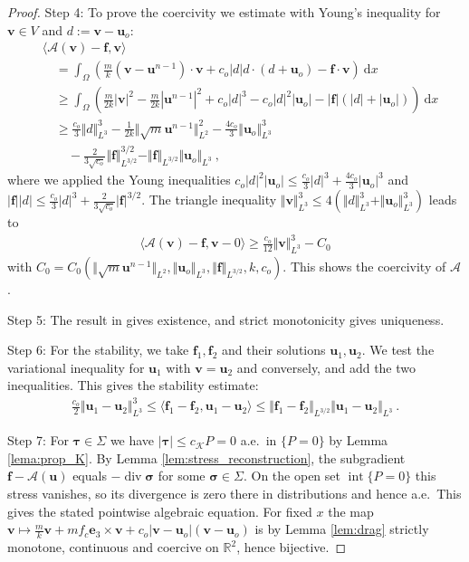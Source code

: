 \documentclass{article}
\theoremstyle{definition}
\newcommand{\bfu}{\boldsymbol{u}}
\newcommand{\bfv}{\boldsymbol{v}}
\newcommand{\bfsigma}{\boldsymbol{\sigma}}
\newcommand{\bftau}{\boldsymbol{\tau}}
\newcommand{\bfe}{\boldsymbol{e}}
\newcommand{\bff}{\boldsymbol{f}}
\newcommand{\K}{\mathcal{K}}
\newcommand{\dd}{\:\mathrm{d}}
\renewcommand\div{\operatorname{\mathrm{div}}}
\begin{document}
\begin{proof}
    Step 4: To prove the coercivity we estimate with Young's inequality for $\bfv\in V$ and
    $d := \bfv -\bfu_o$:
    \begin{align*}
        &\langle \mathcal{A} (\bfv) - \bff , \bfv \rangle\\
        &\quad= \int_\Omega \left(\frac m k (\bfv-\bfu^{n-1})\cdot \bfv + c_o |d| d\cdot(d+\bfu_o)-\bff \cdot \bfv\right) \dd x\\
        &\quad\geq \int_\Omega \left(\frac{m}{2k} |\bfv|^{2} - \frac{m}{2k}|\bfu^{n-1}|^{2} + c_o |d|^3 - c_o |d|^2|\bfu_o|
        -|\bff|(|d|+|\bfu_o|)\right) \dd x\\
        &\quad\geq \frac{c_o}{3} \Vert d \Vert^3_{L^3} - \frac{1}{2k} \Vert \sqrt{m}\bfu^{n-1}\Vert^2_{L^2}
        - \frac{4c_o}{3} \Vert \bfu_o\Vert_{L^3}^3\\
        &\qquad - \frac{2}{3\sqrt{c_o}} \Vert \bff \Vert_{L^{3/2}}^{3/2}
        -\Vert\bff\Vert_{L^{3/2}} \Vert \bfu_o\Vert_{L^3} \ ,
    \end{align*}
    where we applied the Young inequalities $c_o|d|^2|\bfu_o| \leq \frac{c_o}{3}|d|^3 + \frac{4c_o}{3}|\bfu_o|^3$ and
    $|\bff||d| \leq \frac{c_o}{3}|d|^3 + \frac{2}{3\sqrt{c_o}}|\bff|^{3/2}$.
    The triangle inequality $\Vert \bfv\Vert^3_{L^3} \leq 4(\Vert d\Vert_{L^3}^3 + \Vert\bfu_o\Vert^3_{L^3})$
    leads to
    \begin{align*}
        \langle \mathcal{A}(\bfv) - \bff, \bfv - 0\rangle \geq \frac{c_o}{12}\Vert\bfv\Vert^3_{L^3} - C_0
    \end{align*}
    with $C_0 = C_0 (\Vert \sqrt{m}\bfu^{n-1}\Vert_{L^2}, \Vert\bfu_o\Vert_{L^3}, \Vert\bff\Vert_{L^{3/2}}, k, c_o)$.
    This shows the coercivity of $\mathcal{A}$.

    Step 5: The result in \cite{Z85} gives existence, and strict monotonicity gives uniqueness.

    Step 6: For the stability, we take $\bff_1, \bff_2$ and their solutions $\bfu_1, \bfu_2$.
    We test the variational inequality for $\bfu_1$ with $\bfv=\bfu_2$ and conversely, and add the two inequalities.
    This gives the stability estimate:
    \begin{align*}
        \frac{c_o}{2} \Vert \bfu_1-\bfu_2\Vert_{L^{3}}^3 \leq \langle\bff_1-\bff_2,\bfu_1-\bfu_2\rangle
        \leq \Vert \bff_1-\bff_2\Vert_{L^{3/2}}\Vert\bfu_1-\bfu_2\Vert_{L^3} \ .
    \end{align*}

    Step 7: For $\bftau\in\Sigma$ we have $|\bftau|\leq c_\K P=0$ a.e.\ in $\{P=0\}$ by Lemma \ref{lema:prop_K}.
    By Lemma \ref{lem:stress_reconstruction}, the subgradient
    $\bff-\mathcal{A}(\bfu)$ equals $-\div\bfsigma$ for some $\bfsigma\in\Sigma$.
    On the open set $\operatorname{int}\{P=0\}$ this stress vanishes, so its
    divergence is zero there in distributions and hence a.e.\ This gives
    the stated pointwise algebraic equation. For fixed $x$ the map $\bfv \mapsto \frac m k \bfv + m f_c\bfe_3\times \bfv
    +c_o |\bfv-\bfu_o|(\bfv-\bfu_o)$ is by Lemma \ref{lem:drag} strictly monotone, continuous and coercive on
    $\mathbb R^2$, hence bijective.


\end{proof}
\end{document}
